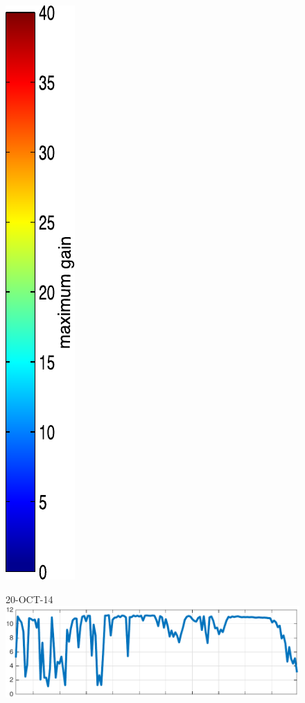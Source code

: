 \begin{figure}
\begin{minipage}[c]{\mylength}
\includegraphics[valign=t,trim=2pt -8pt 0 5pt,width=\colorbarwidth,totalheight=\eventheight]{events/colorbar-40.pdf}
\end{minipage}
\begin{minipage}[c]{\mylength}
\centering \scriptsize 20-OCT-14 \\
\includegraphics[valign=t,trim=0 0 5pt 0,angle=90,origin=tr,width=\sunintwidth,totalheight=\eventheight]{events/20141020-intensity.pdf}

\end{minipage}
\end{figure}
